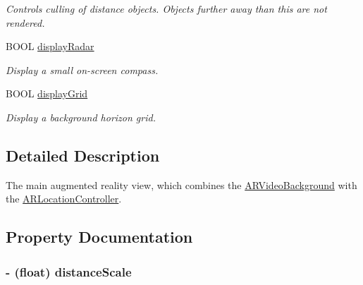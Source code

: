\begin{DoxyCompactItemize}
\begin{DoxyCompactList}\small\item\em \-Controls culling of distance objects. \-Objects further away than this are not rendered. \end{DoxyCompactList}\item 
\hypertarget{interface_a_r_browser_view_a541177be5371872bc4153d8eb8805ff2}{
\-B\-O\-O\-L \hyperlink{interface_a_r_browser_view_a541177be5371872bc4153d8eb8805ff2}{display\-Radar}}
\label{interface_a_r_browser_view_a541177be5371872bc4153d8eb8805ff2}

\begin{DoxyCompactList}\small\item\em \-Display a small on-\/screen compass. \end{DoxyCompactList}\item 
\hypertarget{interface_a_r_browser_view_a767b94294f4358686e88d043198b9881}{
\-B\-O\-O\-L \hyperlink{interface_a_r_browser_view_a767b94294f4358686e88d043198b9881}{display\-Grid}}
\label{interface_a_r_browser_view_a767b94294f4358686e88d043198b9881}

\begin{DoxyCompactList}\small\item\em \-Display a background horizon grid. \end{DoxyCompactList}\end{DoxyCompactItemize}


\subsection{\-Detailed \-Description}
\-The main augmented reality view, which combines the \hyperlink{interface_a_r_video_background}{\-A\-R\-Video\-Background} with the \hyperlink{interface_a_r_location_controller}{\-A\-R\-Location\-Controller}. 

\subsection{\-Property \-Documentation}
\hypertarget{interface_a_r_browser_view_a91aef66437e470e8f51b90f5f2ec613c}{
\subsubsection[{distance\-Scale}]{\setlength{\rightskip}{0pt plus 5cm}-\/ (float) distance\-Scale}}
\label{interface_a_r_browser_view_a91aef66437e470e8f51b90f5f2ec613c}



